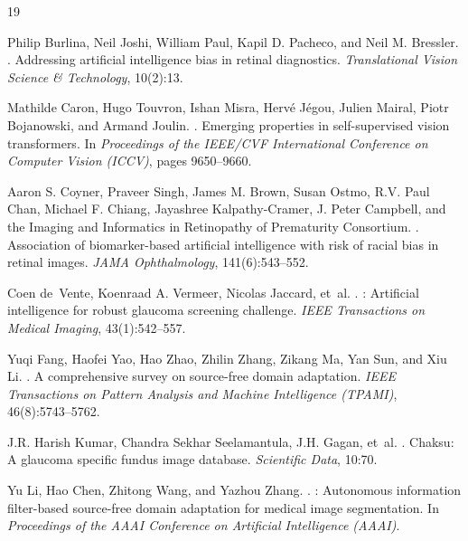 \documentclass[11pt]{article}
\begin{document}
\begin{thebibliography}{19}

Philip Burlina, Neil Joshi, William Paul, Kapil D. Pacheco, and Neil M. Bressler.
.
\newblock Addressing artificial intelligence bias in retinal diagnostics.
\newblock \textit{Translational Vision Science \& Technology}, 10(2):13.

Mathilde Caron, Hugo Touvron, Ishan Misra, Hervé Jégou, Julien Mairal,
  Piotr Bojanowski, and Armand Joulin.
.
\newblock Emerging properties in self-supervised vision transformers.
\newblock In \textit{Proceedings of the IEEE/CVF International Conference on
  Computer Vision (ICCV)}, pages 9650--9660.

Aaron S. Coyner, Praveer Singh, James M. Brown, Susan Ostmo, R.V. Paul Chan,
  Michael F. Chiang, Jayashree Kalpathy-Cramer, J. Peter Campbell, and the
  Imaging and Informatics in Retinopathy of Prematurity Consortium.
.
\newblock Association of biomarker-based artificial intelligence with risk of
  racial bias in retinal images.
\newblock \textit{JAMA Ophthalmology}, 141(6):543--552.

Coen de~Vente, Koenraad A. Vermeer, Nicolas Jaccard, et~al.
.
: Artificial intelligence for robust glaucoma screening
  challenge.
\newblock \textit{IEEE Transactions on Medical Imaging}, 43(1):542--557.

Yuqi Fang, Haofei Yao, Hao Zhao, Zhilin Zhang, Zikang Ma, Yan Sun, and
  Xiu Li.
.
\newblock A comprehensive survey on source-free domain adaptation.
\newblock \textit{IEEE Transactions on Pattern Analysis and Machine
  Intelligence (TPAMI)}, 46(8):5743--5762.

J.R. Harish Kumar, Chandra Sekhar Seelamantula, J.H. Gagan, et~al.
.
\newblock Chaksu: A glaucoma specific fundus image database.
\newblock \textit{Scientific Data}, 10:70.

Yu Li, Hao Chen, Zhitong Wang, and Yazhou Zhang.
.
: Autonomous information filter-based source-free domain
  adaptation for medical image segmentation.
\newblock In \textit{Proceedings of the AAAI Conference on Artificial
  Intelligence (AAAI)}.


\end{thebibliography}
\end{document}
